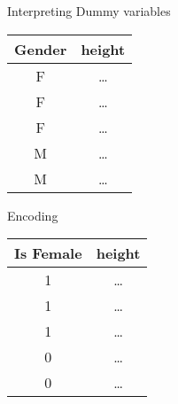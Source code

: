 \documentclass{beamer}
\begin{document}
    \begin{frame}{Interpreting Dummy variables}
    \begin{center}
    \begin{tabular}{c|c}
    Gender& height\\
    \hline
    \hline
    F & \dots \\
    F & \dots \\
    F & \dots \\
    M & \dots \\
    M & \dots \\
    \end{tabular}
    
    \end{center}
    
    \pause Encoding
    
    \begin{center}
    \pause \begin{tabular}{c|c}
    Is Female& height\\
    \hline
    \hline
    1 & \dots \\
    1 & \dots \\
    1 & \dots \\
    0 & \dots \\
    0 & \dots \\
    \end{tabular}
    \end{center}
    
    \end{frame}
    
\end{document}
